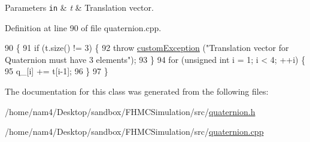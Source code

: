 \begin{DoxyParams}[1]{Parameters}
\mbox{\tt in}  & {\em t} & Translation vector. \\
\hline
\end{DoxyParams}


Definition at line 90 of file quaternion.\-cpp.


\begin{DoxyCode}
90                                                          \{
91     \textcolor{keywordflow}{if} (t.size() != 3) \{
92         \textcolor{keywordflow}{throw} \hyperlink{classcustom_exception}{customException} (\textcolor{stringliteral}{"Translation vector for Quaternion must have 3 elements"});
93     \}
94     \textcolor{keywordflow}{for} (\textcolor{keywordtype}{unsigned} \textcolor{keywordtype}{int} i = 1; i < 4; ++i) \{
95         q\_[i] += t[i-1];
96     \}
97 \}
\end{DoxyCode}


The documentation for this class was generated from the following files\-:\begin{DoxyCompactItemize}
\item 
/home/nam4/\-Desktop/sandbox/\-F\-H\-M\-C\-Simulation/src/\hyperlink{quaternion_8h}{quaternion.\-h}\item 
/home/nam4/\-Desktop/sandbox/\-F\-H\-M\-C\-Simulation/src/\hyperlink{quaternion_8cpp}{quaternion.\-cpp}\end{DoxyCompactItemize}
